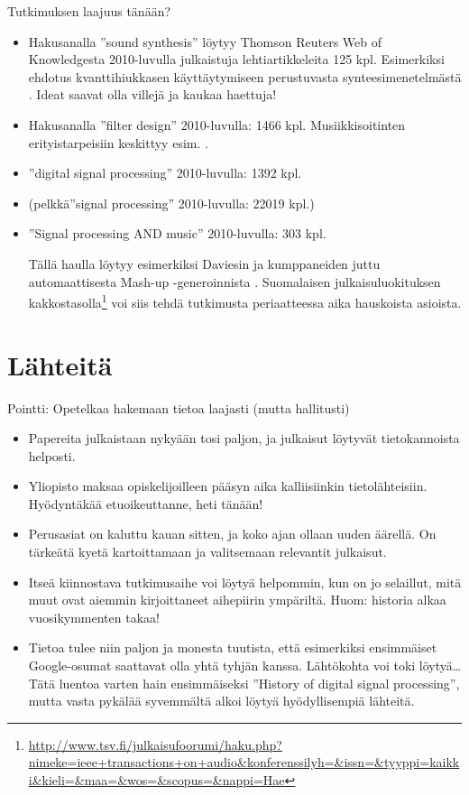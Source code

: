 \documentclass[pdf,handout,10pt]{beamer}
\begin{document}
\begin{frame}{Tutkimuksen laajuus tänään?}
  \begin{itemize}
  \item
    Hakusanalla ''sound synthesis'' löytyy Thomson Reuters Web of
    Knowledgesta 2010-luvulla julkaistuja lehtiartikkeleita 125
    kpl. Esimerkiksi ehdotus kvanttihiukkasen käyttäytymiseen
    perustuvasta synteesimenetelmästä
    \cite{CadizRamos2014quantum}. Ideat saavat olla villejä ja kaukaa
    haettuja!
  \item
    Hakusanalla ''filter design'' 2010-luvulla: 1466
    kpl. Musiikkisoitinten erityistarpeisiin keskittyy
    esim. \cite{Wishnick14timevaryingfilters}.
  \item
    ''digital signal processing'' 2010-luvulla: 1392 kpl.
  \item
    (pelkkä''signal processing'' 2010-luvulla: 22019 kpl.)
  \item
    ''Signal processing AND music'' 2010-luvulla: 303 kpl.
    
    Tällä haulla löytyy esimerkiksi Daviesin ja kumppaneiden juttu
    automaattisesta Mash-up -generoinnista
    \cite{daviesEtal2014automashupper}. Suomalaisen
    julkaisuluokituksen
    kakkostasolla\footnote{{\tiny \url{http://www.tsv.fi/julkaisufoorumi/haku.php?nimeke=ieee+transactions+on+audio&konferenssilyh=&issn=&tyyppi=kaikki&kieli=&maa=&wos=&scopus=&nappi=Hae}}}
    voi siis tehdä tutkimusta periaatteessa aika hauskoista asioista.

  \end{itemize}
\end{frame}


\section{Lähteitä}

\begin{frame}{Pointti: Opetelkaa hakemaan tietoa laajasti (mutta hallitusti)}
  \begin{itemize}
  \item
    Papereita julkaistaan nykyään tosi paljon, ja julkaisut löytyvät
    tietokannoista helposti. 
  \item Yliopisto maksaa opiskelijoilleen pääsyn aika kalliisiinkin
    tietolähteisiin. Hyödyntäkää etuoikeuttanne, heti tänään!
  \item Perusasiat on kaluttu kauan sitten, ja
    koko ajan ollaan uuden äärellä. On tärkeätä kyetä kartoittamaan ja
    valitsemaan relevantit julkaisut.
  \item Itseä kiinnostava tutkimusaihe voi löytyä helpommin, kun on jo
    selaillut, mitä muut ovat aiemmin kirjoittaneet aihepiirin
    ympäriltä. Huom: historia alkaa vuosikymmenten takaa!
  \item Tietoa tulee niin paljon ja monesta tuutista, että esimerkiksi
    ensimmäiset Google-osumat saattavat olla yhtä tyhjän
    kanssa. Lähtökohta voi toki löytyä\ldots Tätä luentoa varten hain
    ensimmäiseksi ''History of digital signal processing'', mutta
    vasta pykälää syvemmältä alkoi löytyä hyödyllisempiä lähteitä.
  \end{itemize}
\end{frame}
\end{document}
